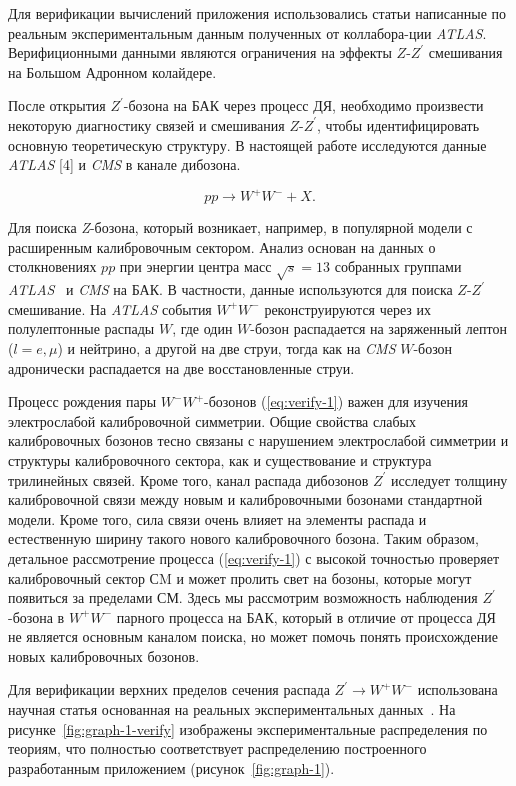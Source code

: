 Для верификации вычислений приложения использовались статьи написанные по реальным экспериментальным данным полученных от коллабора-ции \textit{ATLAS}. Верифиционными данными являются ограничения на эффекты $Z$-${Z}^{\prime}$ смешивания на Большом Адронном колайдере.

После открытия $Z^\prime$-бозона на БАК через процесс ДЯ, необходимо произвести некоторую диагностику связей и смешивания $Z$-$Z^\prime$, чтобы идентифицировать основную теоретическую структуру. В настоящей работе исследуются данные \textit{ATLAS} [4] и \textit{CMS} в канале дибозона.

\begin{equation} \label{eq:verify-1}
pp \rightarrow W^+W^- + X.
\end{equation}

Для поиска \textit{Z}-бозона, который возникает, например, в популярной модели с расширенным калибровочным сектором. Анализ основан на данных о столкновениях $pp$ при энергии центра масс $\sqrt{s} = 13 $ собранных группами \textit{ATLAS}~\cite{ada-wwz:2013} и \textit{CMS} на БАК. В частности, данные используются для поиска $Z$-$Z^\prime$ смешивание. На \textit{ATLAS} события $W^+W^-$ реконструируются через их полулептонные распады $W$, где один $W$-бозон распадается на заряженный лептон ($l=e,\mu$) и нейтрино, а другой на две струи, тогда как на \textit{CMS} $W$-бозон адронически распадается на две восстановленные струи. 

Процесс рождения пары $W^-W^+$-бозонов (\ref{eq:verify-1}) важен для изучения электрослабой калибровочной симметрии. Общие свойства слабых калибровочных бозонов тесно связаны с нарушением электрослабой симметрии и структуры калибровочного сектора, как и существование и структура трилинейных связей. Кроме того, канал распада дибозонов $Z^\prime$ исследует толщину калибровочной связи между новым и калибровочными бозонами стандартной модели. Кроме того, сила связи очень влияет на элементы распада и естественную ширину такого нового калибровочного бозона. Таким образом, детальное рассмотрение процесса (\ref{eq:verify-1}) с высокой точностью проверяет калибровочный сектор СM и может пролить свет на бозоны, которые могут появиться за пределами СМ. Здесь мы рассмотрим возможность наблюдения $Z^\prime$-бозона в $W^+W^-$ парного процесса на БАК, который в отличие от процесса ДЯ не является основным каналом поиска, но может помочь понять происхождение новых калибровочных бозонов.

Для верификации верхних пределов сечения распада ${Z}^{\prime} \rightarrow {W}^{+}{W}^{-} $ использована научная статья основанная на реальных экспериментальных данных~\cite{2part-pankov}. На рисунке~\ref{fig:graph-1-verify} изображены экспериментальные распределения по теориям, что полностью соответствует распределению построенного разработанным приложением (рисунок~\ref{fig:graph-1}).

